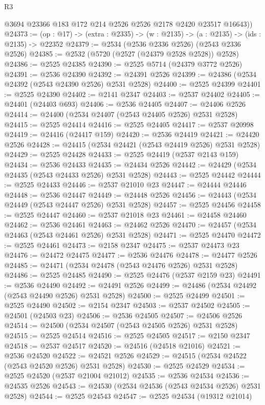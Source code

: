 \begin{lexlean}{R3}
\begin{coremodule}
      @3694 @23366 @183 @172 @214 @2526 @2526 @2178 @2420 @23517 @16643))
@24373 := (op : @17) -> (extra : @2335) -> (w : @2135) -> (a : @2135) -> (ids : @2135) -> @22352
@24379 := @2534 (@2536 @2336 @2526) (@2543 @2336 @2526)
@24385 := @2532 (@5720 (@2527 (@24379 @2528 @2528)) @2528)
@24386 := @2525 @24385
@24390 := @2525 @5714 (@24379 @3772 @2526)
@24391 := @2536 @24390
@24392 := @24391 @2526
@24399 := @24386 (@2534 @24392 (@2543 @24390 @2526) @2531 @2528)
@24400 := @2525 @24399
@24401 := @2525 @24390
@24402 := @2141 @2347
@24403 := @2537 @24402
@24405 := @24401 (@24403 @693)
@24406 := @2536 @24405
@24407 := @24406 @2526
@24414 := @24400 (@2534 @24407 (@2543 @24405 @2526) @2531 @2528)
@24415 := @2525 @24414
@24416 := @2525 @24405
@24417 := @2537 @20998
@24419 := @24416 (@24417 @159)
@24420 := @2536 @24419
@24421 := @24420 @2526
@24428 := @24415 (@2534 @24421 (@2543 @24419 @2526) @2531 @2528)
@24429 := @2525 @24428
@24433 := @2525 @24419 (@2537 @2143 @159)
@24434 := @2536 @24433
@24435 := @24434 @2526
@24442 := @24429 (@2534 @24435 (@2543 @24433 @2526) @2531 @2528)
@24443 := @2525 @24442
@24444 := @2525 @24433
@24446 := @2537 @21010 @23
@24447 := @24444 @24446
@24448 := @2536 @24447
@24449 := @24448 @2526
@24456 := @24443 (@2534 @24449 (@2543 @24447 @2526) @2531 @2528)
@24457 := @2525 @24456
@24458 := @2525 @24447
@24460 := @2537 @21018 @23
@24461 := @24458 @24460
@24462 := @2536 @24461
@24463 := @24462 @2526
@24470 := @24457 (@2534 @24463 (@2543 @24461 @2526) @2531 @2528)
@24471 := @2525 @24470
@24472 := @2525 @24461
@24473 := @2158 @2347
@24475 := @2537 @24473 @23
@24476 := @24472 @24475
@24477 := @2536 @24476
@24478 := @24477 @2526
@24485 := @24471 (@2534 @24478 (@2543 @24476 @2526) @2531 @2528)
@24486 := @2525 @24485
@24490 := @2525 @24476 (@2537 @2159 @23)
@24491 := @2536 @24490
@24492 := @24491 @2526
@24499 := @24486 (@2534 @24492 (@2543 @24490 @2526) @2531 @2528)
@24500 := @2525 @24499
@24501 := @2525 @24490
@24502 := @2154 @2347
@24503 := @2537 @24502
@24505 := @24501 (@24503 @23)
@24506 := @2536 @24505
@24507 := @24506 @2526
@24514 := @24500 (@2534 @24507 (@2543 @24505 @2526) @2531 @2528)
@24515 := @2525 @24514
@24516 := @2525 @24505
@24517 := @2150 @2347
@24518 := @2537 @24517
@24520 := @24516 (@24518 @21016)
@24521 := @2536 @24520
@24522 := @24521 @2526
@24529 := @24515 (@2534 @24522 (@2543 @24520 @2526) @2531 @2528)
@24530 := @2525 @24529
@24534 := @2525 @24520 (@2537 @21004 @21012)
@24535 := @2536 @24534
@24536 := @24535 @2526
@24543 := @24530 (@2534 @24536 (@2543 @24534 @2526) @2531 @2528)
@24544 := @2525 @24543
@24547 := @2525 @24534 (@19312 @21014)

\end{coremodule}
\end{lexlean}
